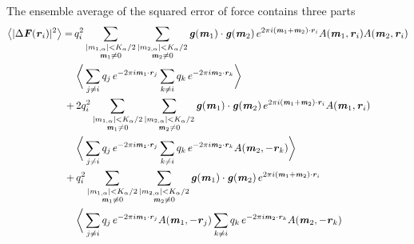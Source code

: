 \documentclass[aps,pre,preprint]{revtex4}
\renewcommand{\v}[1]{\textbf{\textit{#1}}}
\begin{document}
The ensemble average of the squared error of force contains three parts
\begin{align}\nonumber
  \big\langle
  \vert\Delta\v F(\v r_i)\vert^2
  \big\rangle
  = \,&
  q^2_i
  \sum_{
    \begin{subarray}{c}
      \vert m_{1,\alpha}\vert < K_\alpha/2\\
      \v m_1\neq 0
    \end{subarray}}
  \sum_{
    \begin{subarray}{c}
      \vert m_{2,\alpha}\vert < K_\alpha/2\\
      \v m_2\neq 0
    \end{subarray}}
  \v g(\v m_1)\cdot\v g(\v m_2) \,
  e^{2\pi i(\v m_1 + \v m_2)\cdot\v r_i} A(\v m_1,\v r_i) A(\v m_2,\v r_i)
  \\ \nonumber
  &\,
  \bigg\langle
  \sum_{j\neq i}q_j\,e^{-2\pi i\v m_1\cdot\v r_j}  
  \sum_{k\neq i}q_k\,e^{-2\pi i\v m_2\cdot\v r_k}
  \bigg\rangle\\ \nonumber
  +&\,
  2q^2_i
  \sum_{
    \begin{subarray}{c}
      \vert m_{1,\alpha}\vert < K_\alpha/2\\
      \v m_1\neq 0
    \end{subarray}}
  \sum_{
    \begin{subarray}{c}
      \vert m_{2,\alpha}\vert < K_\alpha/2\\
      \v m_2\neq 0
    \end{subarray}}
  \v g(\v m_1)\cdot\v g(\v m_2) \,
  e^{2\pi i(\v m_1 + \v m_2)\cdot\v r_i} A(\v m_1,\v r_i)
  \\ \nonumber
  &\,
  \bigg\langle
  \sum_{j\neq i}q_j\,e^{-2\pi i\v m_1\cdot\v r_j}  
  \sum_{k\neq i}q_k\,e^{-2\pi i\v m_2\cdot\v r_k}A(\v m_2, -\v r_k)
  \bigg\rangle\\ \nonumber
  +&\,
  q^2_i
  \sum_{
    \begin{subarray}{c}
      \vert m_{1,\alpha}\vert < K_\alpha/2\\
      \v m_1\neq 0
    \end{subarray}}
  \sum_{
    \begin{subarray}{c}
      \vert m_{2,\alpha}\vert < K_\alpha/2\\
      \v m_2\neq 0
    \end{subarray}}
  \v g(\v m_1)\cdot\v g(\v m_2) \,
  e^{2\pi i(\v m_1 + \v m_2)\cdot\v r_i} 
  \\ \nonumber
  &\,
  \bigg\langle
  \sum_{j\neq i}q_j\,e^{-2\pi i\v m_1\cdot\v r_j}A(\v m_1, -\v r_j) 
  \sum_{k\neq i}q_k\,e^{-2\pi i\v m_2\cdot\v r_k}A(\v m_2, -\v r_k)

\end{align}
\end{document}

